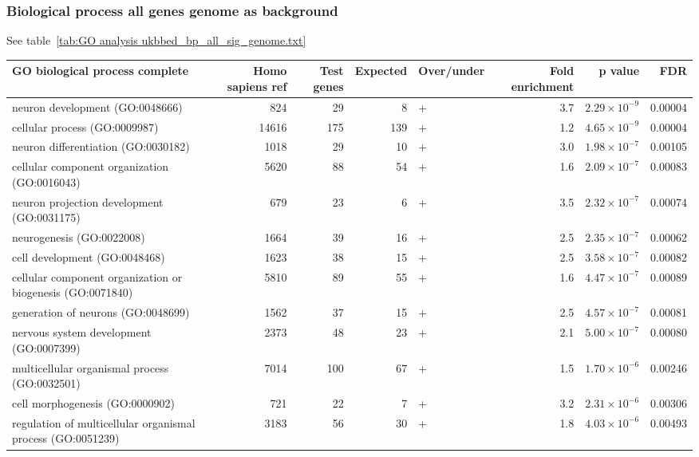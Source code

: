 \subsubsection{Biological process all genes genome as background}
See table~\ref{tab:GO analysis ukbbed_bp_all_sig_genome.txt}
\begin{table}[ht]
\centering
\begin{adjustbox}{width=\textwidth}
\begin{tabular}{lrrrlrrr}
  \hline
GO biological process complete & Homo sapiens ref & Test genes & Expected & Over/under & Fold enrichment & p value & FDR \\ 
  \hline
neuron development (GO:0048666) & 824 & 29 & 8 & + & 3.7 & $2.29 \times 10^{-9}$ & 0.00004 \\ 
  cellular process (GO:0009987) & 14616 & 175 & 139 & + & 1.2 & $4.65 \times 10^{-9}$ & 0.00004 \\ 
  neuron differentiation (GO:0030182) & 1018 & 29 & 10 & + & 3.0 & $1.98 \times 10^{-7}$ & 0.00105 \\ 
  cellular component organization (GO:0016043) & 5620 & 88 & 54 & + & 1.6 & $2.09 \times 10^{-7}$ & 0.00083 \\ 
  neuron projection development (GO:0031175) & 679 & 23 & 6 & + & 3.5 & $2.32 \times 10^{-7}$ & 0.00074 \\ 
  neurogenesis (GO:0022008) & 1664 & 39 & 16 & + & 2.5 & $2.35 \times 10^{-7}$ & 0.00062 \\ 
  cell development (GO:0048468) & 1623 & 38 & 15 & + & 2.5 & $3.58 \times 10^{-7}$ & 0.00082 \\ 
  cellular component organization or biogenesis (GO:0071840) & 5810 & 89 & 55 & + & 1.6 & $4.47 \times 10^{-7}$ & 0.00089 \\ 
  generation of neurons (GO:0048699) & 1562 & 37 & 15 & + & 2.5 & $4.57 \times 10^{-7}$ & 0.00081 \\ 
  nervous system development (GO:0007399) & 2373 & 48 & 23 & + & 2.1 & $5.00 \times 10^{-7}$ & 0.00080 \\ 
  multicellular organismal process (GO:0032501) & 7014 & 100 & 67 & + & 1.5 & $1.70 \times 10^{-6}$ & 0.00246 \\ 
  cell morphogenesis (GO:0000902) & 721 & 22 & 7 & + & 3.2 & $2.31 \times 10^{-6}$ & 0.00306 \\ 
  regulation of multicellular organismal process (GO:0051239) & 3183 & 56 & 30 & + & 1.8 & $4.03 \times 10^{-6}$ & 0.00493 \\ 

\end{tabular}
\end{adjustbox}
\end{table}

